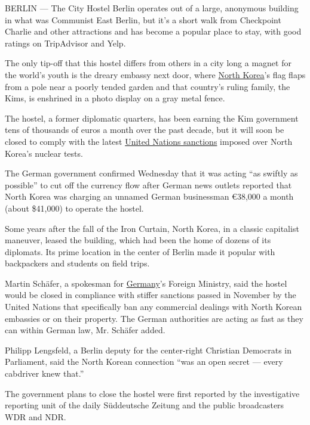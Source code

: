 BERLIN --- The City Hostel Berlin operates out of a large, anonymous
building in what was Communist East Berlin, but it's a short walk from
Checkpoint Charlie and other attractions and has become a popular place
to stay, with good ratings on TripAdvisor and Yelp.

The only tip-off that this hostel differs from others in a city long a
magnet for the world's youth is the dreary embassy next door, where
\href{https://www.nytimes3xbfgragh.onion/topic/destination/north-korea?8qa}{North
Korea}'s flag flaps from a pole near a poorly tended garden and that
country's ruling family, the Kims, is enshrined in a photo display on a
gray metal fence.

The hostel, a former diplomatic quarters, has been earning the Kim
government tens of thousands of euros a month over the past decade, but
it will soon be closed to comply with the latest
\href{https://www.nytimes3xbfgragh.onion/2016/11/30/world/asia/north-korea-un-sanctions.html}{United
Nations sanctions} imposed over North Korea's nuclear tests.

The German government confirmed Wednesday that it was acting ``as
swiftly as possible'' to cut off the currency flow after German news
outlets reported that North Korea was charging an unnamed German
businessman €38,000 a month (about \$41,000) to operate the hostel.

Some years after the fall of the Iron Curtain, North Korea, in a classic
capitalist maneuver, leased the building, which had been the home of
dozens of its diplomats. Its prime location in the center of Berlin made
it popular with backpackers and students on field trips.

Martin Schäfer, a spokesman for
\href{https://www.nytimes3xbfgragh.onion/topic/destination/germany?8qa}{Germany}'s
Foreign Ministry, said the hostel would be closed in compliance with
stiffer sanctions passed in November by the United Nations that
specifically ban any commercial dealings with North Korean embassies or
on their property. The German authorities are acting as fast as they can
within German law, Mr. Schäfer added.

Philipp Lengsfeld, a Berlin deputy for the center-right Christian
Democrats in Parliament, said the North Korean connection ``was an open
secret --- every cabdriver knew that.''

The government plans to close the hostel were first reported by the
investigative reporting unit of the daily Süddeutsche Zeitung and the
public broadcasters WDR and NDR.

